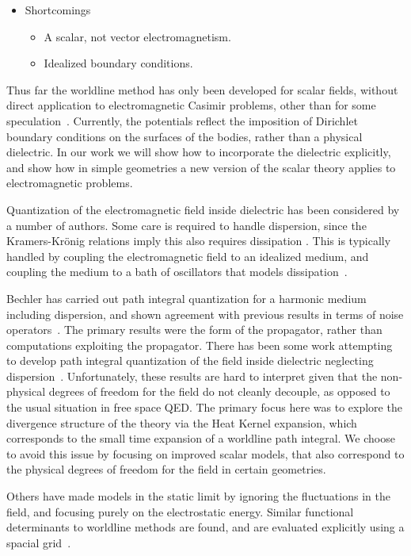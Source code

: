 \begin{itemize}
\begin{itemize}
\item Shortcomings
\begin{itemize}
  \item A scalar, not vector electromagnetism.
  \item Idealized boundary conditions.  
\end{itemize}
  
\end{itemize}


Thus far the worldline method has only been developed for scalar fields, 
without direct application to electromagnetic Casimir problems, 
other than for some speculation~\cite{Aehlig2011}.
  Currently, the potentials reflect the imposition of Dirichlet boundary 
conditions on the surfaces of the bodies, rather than a physical dielectric.
   In our work we will show how to incorporate the dielectric explicitly, 
and show how in simple geometries a new version of the scalar theory applies
 to electromagnetic problems.  

Quantization of the electromagnetic field inside dielectric has been considered
 by a number of authors.  
Some care is required to handle dispersion, since the Kramers-Kr\"onig relations
 imply this also requires dissipation .  
This is typically handled by coupling the electromagnetic field to an idealized
 medium, and coupling the medium to a bath of oscillators that models
 dissipation~\cite{Huttner1992,Dung1998}.  

Bechler has carried out path integral quantization for a harmonic medium 
including dispersion, and shown agreement with previous results in terms 
of noise operators~\cite{Bechler1999}.  
The primary results were the form of the propagator, 
rather than computations exploiting the propagator.
  There has been some work attempting to develop path integral quantization of
 the field inside dielectric neglecting dispersion~\cite{Bordag1998}.
  Unfortunately, these results are hard to interpret given that the non-physical
 degrees of freedom for the field do not cleanly decouple, as opposed to the 
usual situation in free space QED.
  The primary focus here was to explore the divergence structure of the theory
 via the Heat Kernel expansion, which corresponds to the small time expansion
 of a worldline path integral.
  We choose to avoid this issue by focusing on improved scalar models, 
that also correspond to the physical degrees of freedom for the field in certain geometries.  

Others have made models in the static limit by ignoring the fluctuations in the field,
and focusing purely on the electrostatic energy.
 Similar functional determinants to worldline methods are found,
 and are evaluated explicitly using a spacial grid~\cite{Pasquali2008}.  



\end{itemize}
